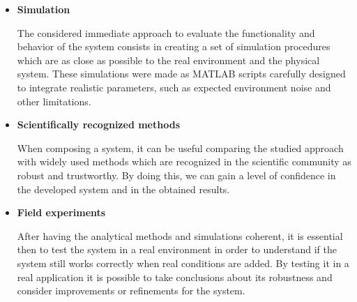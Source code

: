\begin{itemize}
	
	\item \textbf{Simulation}
	
	The considered immediate approach to evaluate the functionality and behavior of the system consists in creating a set of simulation procedures which are as close as possible to the real environment and the physical system. These simulations were made as MATLAB scripts carefully designed to integrate realistic parameters, such as expected environment noise and other limitations.
	
	\item \textbf{Scientifically recognized methods}
	
	When composing a system, it can be useful comparing the studied approach with widely used methods which are recognized in the scientific community as robust and trustworthy. By doing this, we can gain a level of confidence in the developed system and in the obtained results.
	
	\item \textbf{Field experiments}
	
	After having the analytical methods and simulations coherent, it is essential then to test the system in a real environment in order to understand if the system still works correctly when real conditions are added. By testing it in a real application it is possible to take conclusions about its robustness and consider improvements or refinements for the system.
	
\end{itemize}
